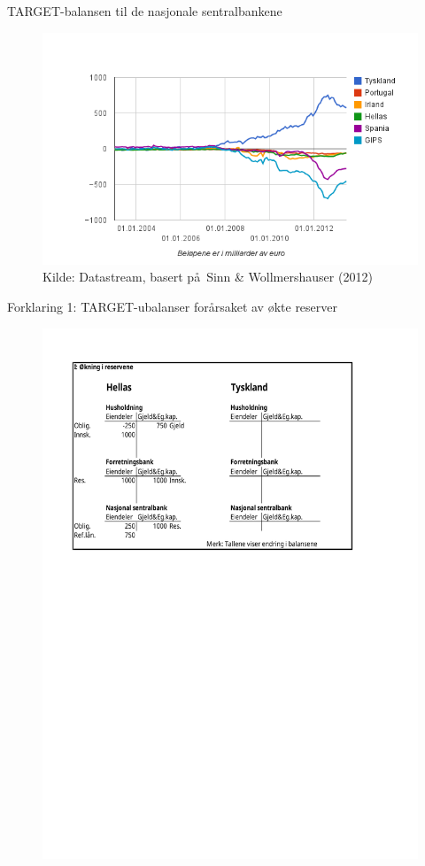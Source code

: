 \documentclass[notes=show notes]{beamer}
\begin{document}
\begin{frame}{TARGET-balansen til de nasjonale sentralbankene}
\begin{figure}
\centering
\includegraphics[width=0.9\linewidth]{Fig4_TARGET_gjeld_fordringer_G}
\center \small{Kilde: Datastream, basert p\aa \   Sinn \& Wollmershauser (2012)}
\label{fig:Fig4_TARGET_gjeld_fordringer_G}
\end{figure}
\end{frame}
\begin{frame}{Forklaring 1: TARGET-ubalanser for\aa rsaket av
		\o kte reserver}
\begin{figure}
\centering
\includegraphics[width=0.9\linewidth]{Fork1_delI}
\label{fig:Fork1_dellI-1}
\end{figure}
\end{frame}
\end{document}
